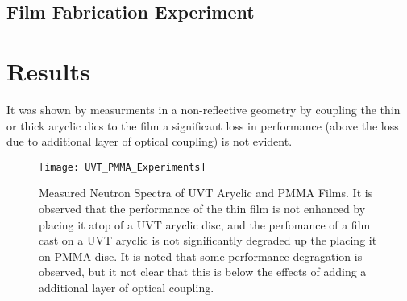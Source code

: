 \documentclass[draftcls,onecolumn]{IEEEtran}
\begin{document}
\subsection{Film Fabrication Experiment}

\section{Results}

It was shown by measurments in a non-reflective geometry by coupling the thin or thick aryclic dics to the film a significant loss in performance (above the loss due to additional layer of optical coupling) is not evident.
\begin{figure}
  \centering
  \texttt{[image: UVT\_PMMA\_Experiments]}
  \caption[Measured Effect of UVT Aryclic and PMMA]{Measured Neutron Spectra of UVT Aryclic and PMMA Films. It is observed that the performance of the thin film is not enhanced by placing it atop of a UVT aryclic disc, and the perfomance of a film cast on a UVT aryclic is not significantly degraded up the placing it on PMMA disc. It is noted that some performance degragation is observed, but it not clear that this is below the effects of adding a additional layer of optical coupling.}
  \label{fig:RadMeasuredExper}
\end{figure}
\end{document}
